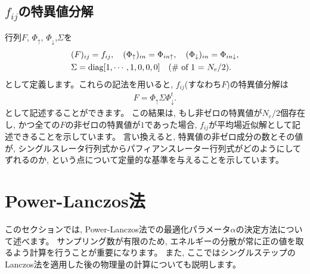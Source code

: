 \subsection{$f_{ij}$の特異値分解}
行列$F$, $\Phi_{\uparrow}$, $\Phi_{\downarrow}$,$\Sigma$を
\begin{align}
&(F)_{ij}=f_{ij},~~~ 
(\Phi_{\uparrow})_{in}=\Phi_{in\uparrow},~~~ 
(\Phi_{\downarrow})_{in}=\Phi_{in\downarrow}, \\
&\Sigma={\rm diag}[1,\cdots,1,0,0,0]~~~\text{({\rm \# of 1} = $N_{e}/2$)}.
\end{align}
として定義します。これらの記法を用いると, $f_{ij}$(すなわち$F$)の特異値分解は
\begin{align}
F=\Phi_{\uparrow}\Sigma\Phi_{\downarrow}^{t}.
\end{align}
として記述することができます。
この結果は, もし非ゼロの特異値が$N_{e}/2$個存在し, 
かつ全ての$F$の非ゼロの特異値が$1$であった場合, 
$f_{ij}$が平均場近似解として記述できることを示しています。
言い換えると, 特異値の非ゼロ成分の数とその値が, 
シングルスレータ行列式からパフィアンスレーター行列式がどのようにしてずれるのか, 
という点について定量的な基準を与えることを示しています。

\section{Power-Lanczos法}
このセクションでは, Power-Lanczos法での最適化パラメータ$\alpha$の決定方法について述べます。
サンプリング数が有限のため, エネルギーの分散が常に正の値を取るよう計算を行うことが重要になります。
また, ここではシングルステップのLanczos法を適用した後の物理量の計算についても説明します。
